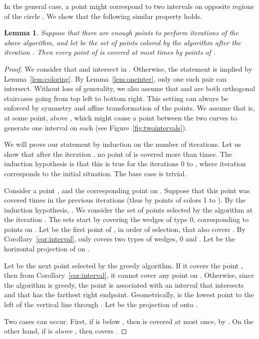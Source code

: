 \documentclass[english,11pt]{article}
\newtheorem{lemma}{Lemma}
\begin{document}
In the general case, a point  might correspond to two intervals on opposite regions of the circle . We show that the following similar property holds.
\begin{lemma}
\label{lem:gen-coloring}
Suppose that there are enough points to perform  iterations of the above algorithm, and let  be the set of points colored by the algorithm after the iteration . Then every point of  is covered at most  times by points of .
\end{lemma}
\begin{proof}
We consider that  and  intersect in . Otherwise, the statement is implied by Lemma~\ref{lem:coloring}. By Lemma~\ref{lem:oneinter}, only one such pair can intersect. Without loss of generality, we also assume that  and  are both orthogonal staircases going from top left to bottom right. This setting can always be enforced by symmetry and affine transformation of the points. We assume that  is, at some point, above , which might cause a point between the two curves to generate one interval on each (see Figure~\ref{fig:twointervals}).

We will prove our statement by induction on the number of iterations. Let us show that after the iteration , no point of  is covered more than  times. The induction hypothesis is that this is true for the iterations 0 to , where iteration  corresponds to the initial situation. The base case  is trivial.

Consider a point , and the corresponding point  on  . Suppose that this point was covered  times in the previous iterations (thus by points of colors 1 to ). By the induction hypothesis, .
We consider the set of points  selected by the algorithm at the iteration . The sets  start by covering the wedges of type 0, corresponding to points on . Let  be the first point of , in order of selection, that also covers . By Corollary~\ref{cor:interval},  only covers two types of wedges, 0 and . Let  be the horizontal projection of  on .

Let  be the next point selected by the greedy algorithm. If it covers the point , then from Corollary~\ref{cor:interval}, it cannot cover any point on . Otherwise, since the algorithm is greedy, the point is associated with an interval that intersects  and that has the farthest right endpoint. Geometrically,  is the lowest point to the left of the vertical line  through . Let  be the projection of  onto .
   
Two cases can occur. First, if  is below , then  is covered at most once, by .
On the other hand, if  is above , then  covers . 


\end{proof}
\end{document}

